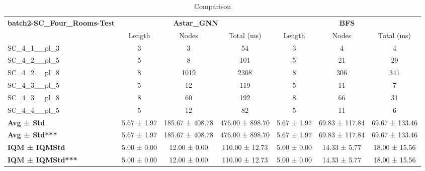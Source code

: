 \begin{table}[!ht]
\centering
\small
\begin{tabular}{l|ccc|ccc}
\multirow{2}{*}{\textbf{batch2-SC\_Four\_Rooms-Test}} & \multicolumn{3}{c|}{\textbf{Astar\_GNN}} & \multicolumn{3}{c}{\textbf{BFS}} \\
\cline{2-7}
& Length & Nodes & Total (ms) & Length & Nodes & Total (ms) \\
\hline
SC\_4\_1\_\_pl\_3 & 3 & 3 & 54 & 3 & 4 & 4 \\
SC\_4\_2\_\_pl\_5 & 5 & 8 & 101 & 5 & 21 & 29 \\
SC\_4\_2\_\_pl\_8 & 8 & 1019 & 2308 & 8 & 306 & 341 \\
SC\_4\_3\_\_pl\_5 & 5 & 12 & 119 & 5 & 11 & 7 \\
SC\_4\_3\_\_pl\_8 & 8 & 60 & 192 & 8 & 66 & 31 \\
SC\_4\_4\_\_pl\_5 & 5 & 12 & 82 & 5 & 11 & 6 \\
\hline
\textbf{Avg ± Std} & 5.67 ± 1.97 & 185.67 ± 408.78 & 476.00 ± 898.70 & 5.67 ± 1.97 & 69.83 ± 117.84 & 69.67 ± 133.46 \\
\textbf{Avg ± Std***} & 5.67 ± 1.97 & 185.67 ± 408.78 & 476.00 ± 898.70 & 5.67 ± 1.97 & 69.83 ± 117.84 & 69.67 ± 133.46 \\
\textbf{IQM ± IQMStd} & 5.00 ± 0.00 & 12.00 ± 0.00 & 110.00 ± 12.73 & 5.00 ± 0.00 & 14.33 ± 5.77 & 18.00 ± 15.56 \\
\textbf{IQM ± IQMStd***} & 5.00 ± 0.00 & 12.00 ± 0.00 & 110.00 ± 12.73 & 5.00 ± 0.00 & 14.33 ± 5.77 & 18.00 ± 15.56 \\
\end{tabular}
\caption{Comparison}
\label{tab:batch2_SC_Four_Rooms_comparison_test}
\end{table}
